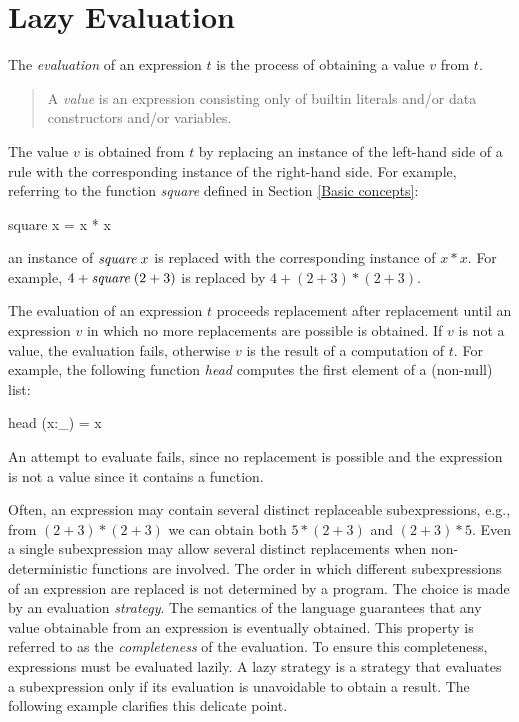 
\section{Lazy Evaluation}
\label{sec-lazy-evaluation}

The \emph{evaluation}
of an expression $t$ is the process of
obtaining a value $v$ from $t$.
%
\begin{quote}
A \emph{value} is an expression consisting
only of builtin literals and/or data constructors and/or variables.
\end{quote}
%
The value $v$ is obtained from $t$ by replacing an instance of
the left-hand side of a rule with the corresponding
instance of the right-hand side.
For example, referring to the function \emph{square} defined
in Section \ref{Basic concepts}:
%
\begin{prog}
square x = x * x
\end{prog}
%
an instance of $\emph{square}\;x$
is replaced with the corresponding instance of $x * x$.
For example, $4+\emph{square}\;(2+3)$ is replaced by $4+(2+3)*(2+3)$.

The evaluation of an expression $t$ 
proceeds replacement after replacement until an expression $v$
in which no more replacements are possible is obtained.
If $v$ is not a value, the evaluation fails,
otherwise $v$ is the result of a computation of $t$.
For example, the following function \emph{head}
computes the first element of a (non-null) list:
%
\begin{prog}
head (x:_) = x
\end{prog}
%
An attempt to evaluate  fails, since
no replacement is possible and the expression is not a value
since it contains a function.

Often, an expression may contain several distinct replaceable subexpressions,
e.g., from $(2+3)*(2+3)$ we can obtain both $5*(2+3)$ and $(2+3)*5$.
Even a single subexpression may allow several distinct replacements
when non-deterministic functions are involved.
The order in which different subexpressions of an expression are
replaced is not determined by a program.
The choice is made by an evaluation
\emph{strategy}.
The semantics of the language guarantees that any
value obtainable from an expression is eventually obtained.
This property is referred to as the
\emph{completeness}
of the evaluation.
To ensure this completeness, expressions must be evaluated
lazily.
A lazy strategy is a strategy that evaluates a subexpression
only if its evaluation is unavoidable to obtain a result.
The following example clarifies this delicate point.

